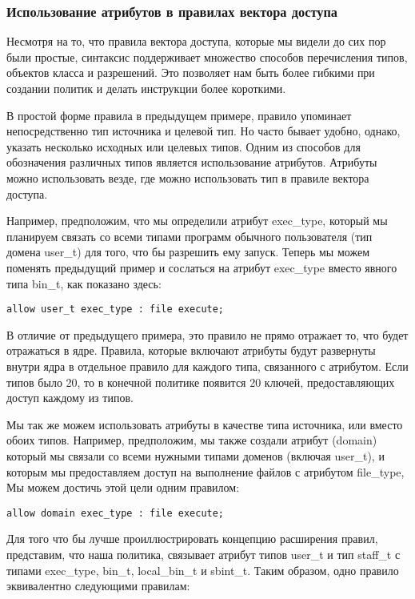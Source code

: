 \documentclass{./../class/UIR}
\begin{document}
\subsubsection{Использование атрибутов в правилах вектора доступа}

Несмотря на то, что правила вектора доступа, которые мы видели до сих пор были
простые, синтаксис поддерживает множество способов перечисления типов, объектов
класса и разрешений. Это позволяет нам быть более гибкими при создании политик и
делать инструкции более короткими.

В простой форме правила в предыдущем примере, правило упоминает непосредственно
тип источника и целевой тип. Но часто бывает удобно, однако,  указать несколько
исходных или целевых типов. Одним из способов для обозначения различных типов
является использование атрибутов. Атрибуты можно использовать везде, где можно
использовать тип в правиле вектора доступа.

Например, предположим, что мы определили атрибут exec\_type, который мы
планируем связать со всеми типами программ обычного пользователя (тип домена user\_t) для
того, что бы разрешить ему запуск. Теперь мы можем поменять предыдущий пример и
сослаться на атрибут exec\_type вместо явного типа bin\_t, как показано здесь:

\begin{verbatim}
allow user_t exec_type : file execute;
\end{verbatim}

В отличие от предыдущего примера, это правило не прямо отражает то, что будет
отражаться в ядре. Правила, которые включают атрибуты будут развернуты внутри
ядра в отдельное правило для каждого типа, связанного с атрибутом. Если типов
было 20, то в конечной политике появится 20 ключей, предоставляющих доступ
каждому из типов.

Мы так же можем использовать атрибуты в качестве типа источника, или вместо
обоих типов. Например, предположим, мы также создали атрибут (domain) который мы
связали со всеми нужными  типами доменов (включая user\_t), и которым мы
предоставляем доступ на выполнение файлов с атрибутом file\_type, Мы можем
достичь этой цели одним правилом:

\begin{verbatim}
allow domain exec_type : file execute;
\end{verbatim}

Для того что бы лучше проиллюстрировать концепцию расширения правил, представим,
что наша политика, связывает атрибут типов user\_t и  тип staff\_t с типами 
exec\_type, bin\_t,  local\_bin\_t  и sbint\_t. Таким образом, одно правило
эквивалентно следующими правилам:
\end{document}

